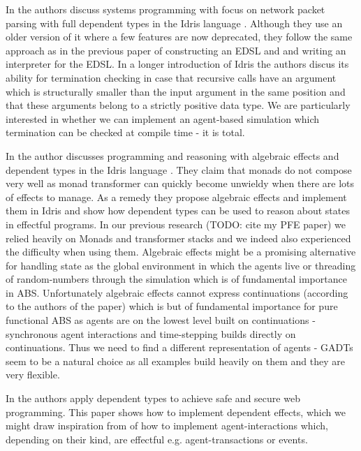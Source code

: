 In \cite{brady_idris_2011} the authors discuss systems programming with focus on network packet parsing with full dependent types in the Idris language \cite{brady_idris_2013}. Although they use an older version of it where a few features are now deprecated, they follow the same approach as in the previous paper of constructing an EDSL and and writing an interpreter for the EDSL. In a longer introduction of Idris the authors discus its ability for termination checking in case that recursive calls have an argument which is structurally smaller than the input argument in the same position and that these arguments belong to a strictly positive data type. We are particularly interested in whether we can implement an agent-based simulation which termination can be checked at compile time - it is total.

In \cite{brady_programming_2013} the author discusses programming and reasoning with algebraic effects and dependent types in the Idris language \cite{brady_idris_2013}. They claim that monads do not compose very well as monad transformer can quickly become unwieldy when there are lots of effects to manage. As a remedy they propose algebraic effects and implement them in Idris and show how dependent types can be used to reason about states in effectful programs. In our previous research (TODO: cite my PFE paper) we relied heavily on Monads and transformer stacks and we indeed also experienced the difficulty when using them. Algebraic effects might be a promising alternative for handling state as the global environment in which the agents live or threading of random-numbers through the simulation which is of fundamental importance in ABS. Unfortunately algebraic effects cannot express continuations (according to the authors of the paper) which is but of fundamental importance for pure functional ABS as agents are on the lowest level built on continuations - synchronous agent interactions and time-stepping builds directly on continuations. Thus we need to find a different representation of agents - GADTs seem to be a natural choice as all examples build heavily on them and they are very flexible.

In \cite{fowler_dependent_2014} the authors apply dependent types to achieve safe and secure web programming. This paper shows how to implement dependent effects, which we might draw inspiration from of how to implement agent-interactions which, depending on their kind, are effectful e.g. agent-transactions or events.

